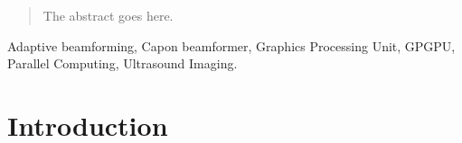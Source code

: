 \documentclass[journal]{IEEEtran}
\begin{document}







\maketitle


\begin{abstract}
The abstract goes here.
\end{abstract}

\begin{IEEEkeywords}
Adaptive beamforming, Capon beamformer, Graphics Processing Unit, GPGPU, Parallel Computing, Ultrasound Imaging.
\end{IEEEkeywords}






%
\IEEEpeerreviewmaketitle



\section{Introduction}
% 
% 
% 
% 
\end{document}
